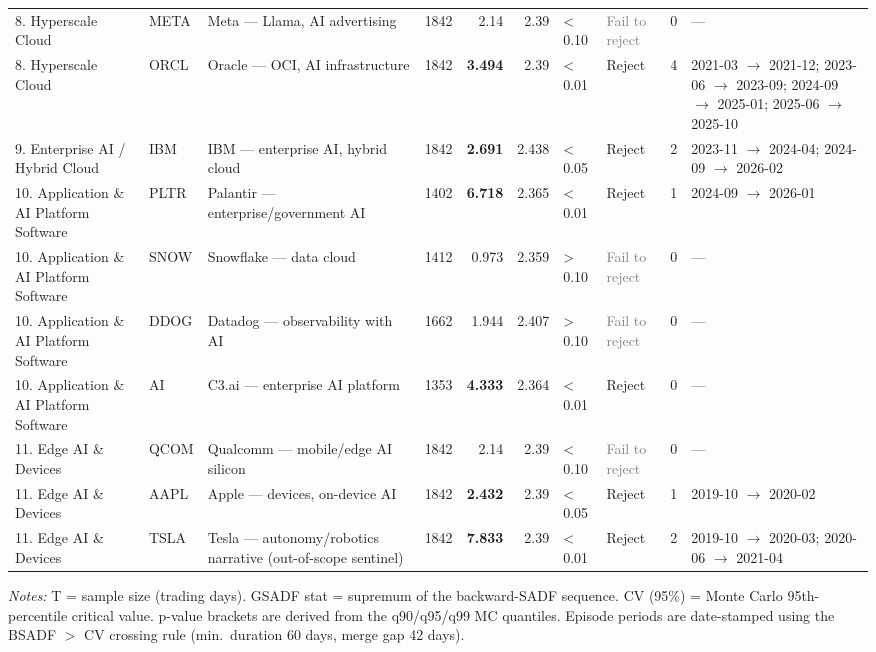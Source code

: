\begin{table}[htbp]
\begin{tabular}{llp{3.8cm}rrrllrp{4cm}}
8. Hyperscale Cloud & META & Meta --- Llama, AI advertising & 1842 & 2.14 & 2.39 & < 0.10 & \textcolor{gray}{Fail to reject} & 0 & --- \\
8. Hyperscale Cloud & ORCL & Oracle --- OCI, AI infrastructure & 1842 & \textbf{3.494} & 2.39 & < 0.01 & \textcolor{red!60!black}{Reject} & 4 & 2021-03 $\to$ 2021-12; 2023-06 $\to$ 2023-09; 2024-09 $\to$ 2025-01; 2025-06 $\to$ 2025-10 \\
\midrule
9. Enterprise AI / Hybrid Cloud & IBM & IBM --- enterprise AI, hybrid cloud & 1842 & \textbf{2.691} & 2.438 & < 0.05 & \textcolor{red!60!black}{Reject} & 2 & 2023-11 $\to$ 2024-04; 2024-09 $\to$ 2026-02 \\
\midrule
10. Application \& AI Platform Software & PLTR & Palantir --- enterprise/government AI & 1402 & \textbf{6.718} & 2.365 & < 0.01 & \textcolor{red!60!black}{Reject} & 1 & 2024-09 $\to$ 2026-01 \\
10. Application \& AI Platform Software & SNOW & Snowflake --- data cloud & 1412 & 0.973 & 2.359 & > 0.10 & \textcolor{gray}{Fail to reject} & 0 & --- \\
10. Application \& AI Platform Software & DDOG & Datadog --- observability with AI & 1662 & 1.944 & 2.407 & > 0.10 & \textcolor{gray}{Fail to reject} & 0 & --- \\
10. Application \& AI Platform Software & AI & C3.ai --- enterprise AI platform & 1353 & \textbf{4.333} & 2.364 & < 0.01 & \textcolor{red!60!black}{Reject} & 0 & --- \\
\midrule
11. Edge AI \& Devices & QCOM & Qualcomm --- mobile/edge AI silicon & 1842 & 2.14 & 2.39 & < 0.10 & \textcolor{gray}{Fail to reject} & 0 & --- \\
11. Edge AI \& Devices & AAPL & Apple --- devices, on-device AI & 1842 & \textbf{2.432} & 2.39 & < 0.05 & \textcolor{red!60!black}{Reject} & 1 & 2019-10 $\to$ 2020-02 \\
11. Edge AI \& Devices & TSLA & Tesla --- autonomy/robotics narrative (out-of-scope sentinel) & 1842 & \textbf{7.833} & 2.39 & < 0.01 & \textcolor{red!60!black}{Reject} & 2 & 2019-10 $\to$ 2020-03; 2020-06 $\to$ 2021-04 \\
\bottomrule
\end{tabular}
\begin{tablenotes}
\footnotesize
\item \textit{Notes:} T = sample size (trading days). GSADF stat = supremum of the backward-SADF sequence. CV (95\%) = Monte Carlo 95th-percentile critical value. p-value brackets are derived from the q90/q95/q99 MC quantiles. Episode periods are date-stamped using the BSADF $>$ CV crossing rule (min.\ duration 60 days, merge gap 42 days).
\end{tablenotes}
\end{table}